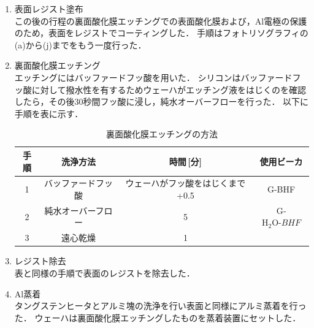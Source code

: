 \documentclass[11pt]{jarticle}
\begin{document}
\begin{enumerate}
			\item 表面レジスト塗布\\
				この後の行程の裏面酸化膜エッチングでの表面酸化膜および，Al電極の保護のため，表面をレジストでコーティングした．
				手順はフォトリソグラフィの(a)から(j)までをもう一度行った．

			\item 裏面酸化膜エッチング\\
				エッチングにはバッファードフッ酸を用いた．
				シリコンはバッファードフッ酸に対して撥水性を有するためウェーハがエッチング液をはじくのを確認したら，その後30秒間フッ酸に浸し，純水オーバーフローを行った．
				以下に手順を表に示す．
				\begin{table}[H]
				\begin{center}
				\caption{裏面酸化膜エッチングの方法}
				\label{tab:uraetching}
				\begin{tabular}{c|ccc} \toprule
					手順&洗浄方法&時間\,[分]&使用ビーカ\\ \hline
					1&バッファードフッ酸&ウェーハがフッ酸をはじくまで +0.5&G‐BHF\\
					2&純水オーバーフロー&5&G‐$\mathrm{H_{2}O}‐BHF$\\
					3&遠心乾燥&1&\\ \bottomrule
				\end{tabular}
				\end{center}
				\end{table}

			\item レジスト除去\\
				表と同様の手順で表面のレジストを除去した．

			\item Al蒸着\\
				タングステンヒータとアルミ塊の洗浄を行い表面と同様にアルミ蒸着を行った．
				ウェーハは裏面酸化膜エッチングしたものを蒸着装置にセットした．
		\end{enumerate}
\end{document}
